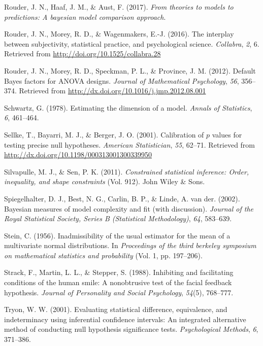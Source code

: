 \documentclass[english,man]{apa6}
\theoremstyle{definition}
\theoremstyle{definition}
\theoremstyle{remark}
\begin{document}
\hypertarget{ref-Rouder:etal:2017}{}
Rouder, J. N., Haaf, J. M., \& Aust, F. (2017). \emph{From theories to
models to predictions: A bayesian model comparison approach}.

\hypertarget{ref-Rouder:etal:2016b}{}
Rouder, J. N., Morey, R. D., \& Wagenmakers, E.-J. (2016). The interplay
between subjectivity, statistical practice, and psychological science.
\emph{Collabra}, \emph{2}, 6. Retrieved from
\url{http://doi.org/10.1525/collabra.28}

\hypertarget{ref-Rouder:etal:2012}{}
Rouder, J. N., Morey, R. D., Speckman, P. L., \& Province, J. M. (2012).
Default Bayes factors for ANOVA designs. \emph{Journal of Mathematical
Psychology}, \emph{56}, 356--374. Retrieved from
\url{http://dx.doi.org/10.1016/j.jmp.2012.08.001}

\hypertarget{ref-Schwartz:1978}{}
Schwartz, G. (1978). Estimating the dimension of a model. \emph{Annals
of Statistics}, \emph{6}, 461--464.

\hypertarget{ref-Sellke:etal:2001}{}
Sellke, T., Bayarri, M. J., \& Berger, J. O. (2001). Calibration of
\(p\) values for testing precise null hypotheses. \emph{American
Statistician}, \emph{55}, 62--71. Retrieved from
\url{http://dx.doi.org/10.1198/000313001300339950}

\hypertarget{ref-Silvapulle:Sen:2011}{}
Silvapulle, M. J., \& Sen, P. K. (2011). \emph{Constrained statistical
inference: Order, inequality, and shape constraints} (Vol. 912). John
Wiley \& Sons.

\hypertarget{ref-Spiegelhalter:etal:2002}{}
Spiegelhalter, D. J., Best, N. G., Carlin, B. P., \& Linde, A. van der.
(2002). Bayesian measures of model complexity and fit (with discussion).
\emph{Journal of the Royal Statistical Society, Series B (Statistical
Methodology)}, \emph{64}, 583--639.

\hypertarget{ref-Stein:1956}{}
Stein, C. (1956). Inadmissibility of the usual estimator for the mean of
a multivariate normal distributions. In \emph{Proceedings of the third
berkeley symposium on mathematical statistics and probability} (Vol. 1,
pp. 197--206).

\hypertarget{ref-Strack:etal:1988}{}
Strack, F., Martin, L. L., \& Stepper, S. (1988). Inhibiting and
facilitating conditions of the human smile: A nonobtrusive test of the
facial feedback hypothesis. \emph{Journal of Personality and Social
Psychology}, \emph{54}(5), 768--777.

\hypertarget{ref-Tryon:2001}{}
Tryon, W. W. (2001). Evaluating statistical difference, equivalence, and
indeterminacy using inferential confidence intervals: An integrated
alternative method of conducting null hypothesis significance tests.
\emph{Psychological Methods}, \emph{6}, 371--386.
\end{document}
